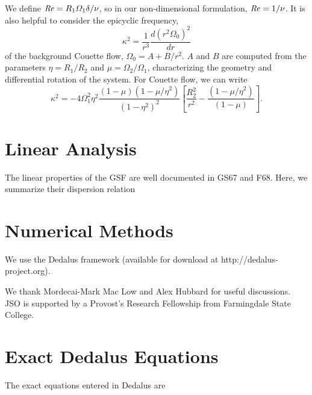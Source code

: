 \documentclass{jfm}
\begin{document}
We define $\mbox{\textit{Re}} = R_1 \varOmega_1 \delta/\nu$, so in our non-dimensional
formulation, $\mbox{\textit{Re}} = 1/\nu$. It is also helpful to consider the epicyclic frequency, 
\begin{equation}
  \label{eq:epicyclic_freq}
\kappa^2 = \frac{1}{r^3}\frac{d (r^2 \Omega_0)^2}{dr}
\end{equation}
of the background Couette flow, $\Omega_0 = A + B/r^2$. $A$ and $B$
are computed from the parameters $\eta = R_1/R_2$ and
$\mu = \Omega_2/\Omega_1$, characterizing the geometry and
differential rotation of the system. For Couette flow, we can write 
\begin{equation}
  \label{eq:kappa_couette}
  \kappa^2 = - 4 \Omega_1^2 \eta^2
  \frac{(1-\mu)(1-\mu/\eta^2)}{(1-\eta^2)^2}
  \left[\frac{R_2^2}{r^2} -\frac{(1-\mu/\eta^2)}{(1-\mu)} \right].
\end{equation}

\section{Linear Analysis}
\label{sec:linear}
The linear properties of the GSF are well documented in GS67 and
F68. Here, we summarize their dispersion relation 

\section{Numerical Methods}
\label{sec:numerical}
We use the Dedalus framework (available for download at
http://dedalus-project.org). 


We thank Mordecai-Mark Mac Low and Alex Hubbard for useful
discussions. JSO is supported by a Provost's Research Fellowship from
Farmingdale State College.
\appendix
\section{Exact Dedalus Equations}
\label{sec:appendix_dedalus}
The exact equations entered in Dedalus are 



\end{document}

